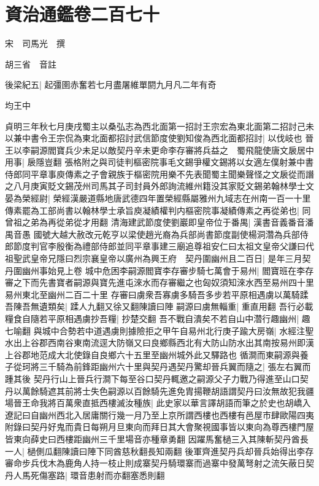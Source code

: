 \section{資治通鑑卷二百七十}
宋　司馬光　撰

胡三省　音註

後梁紀五|{
	起彊圉赤奮若七月盡屠維單閼九月凡二年有奇}


均王中

貞明三年秋七月庚戌蜀主以桑弘志為西北面第一招討王宗宏為東北面第二招討己未以兼中書令王宗侃為東北面都招討武信節度使劉知俊為西北面都招討|{
	以伐岐也}
晉王以李嗣源閻寶兵少未足以敵契丹辛未更命李存審將兵益之　蜀飛龍使唐文扆居中用事|{
	扆隱豈翻}
張格附之與司徒判樞密院事毛文錫爭權文錫將以女適左僕射兼中書侍郎同平章事庾傳素之子會親族于樞密院用樂不先表聞蜀主聞樂聲怪之文扆從而譖之八月庚寅貶文錫茂州司馬其子司封員外郎詢流維州籍没其家貶文錫弟翰林學士文晏為榮經尉|{
	榮經漢嚴道縣地唐武德四年置榮經縣屬雅州九域志在州南一百一十里}
傳素罷為工部尚書以翰林學士承旨庾凝績權判内樞密院事凝績傳素之再從弟也|{
	同曾祖之弟為再從弟從才用翻}
清海建武節度使劉巖即皇帝位于番禺|{
	漢書音義番音潘禺音愚}
國號大越大赦改元乾亨以梁使趙光裔為兵部尚書節度副使楊洞濳為兵部侍郎節度判官李殷衡為禮部侍郎並同平章事建三廟追尊祖安仁曰太祖文皇帝父謙曰代祖聖武皇帝兄隱曰烈宗襄皇帝以廣州為興王府　契丹圍幽州且二百日|{
	是年三月契丹圍幽州事始見上卷}
城中危困李嗣源閻寶李存審步騎七萬會于易州|{
	閻寶班在李存審之下而先書寶者嗣源與寶先進屯淶水而存審繼之也匈奴須知淶水西至易州四十里易州東北至幽州二百二十里}
存審曰虜衆吾寡虜多騎吾多步若平原相遇虜以萬騎蹂吾陳吾無遺類矣|{
	蹂人九翻又徐又翻陳讀曰陣}
嗣源曰虜無輜重|{
	重直用翻}
吾行必載糧食自隨若平原相遇虜抄吾糧|{
	抄楚交翻}
吾不戰自潰矣不若自山中濳行趣幽州|{
	趣七喻翻}
與城中合勢若中道遇虜則據險拒之甲午自易州北行庚子踰大房嶺|{
	水經注聖水出上谷郡西南谷東南流逕大防嶺又曰良鄉縣西北有大防山防水出其南按易州即漢上谷郡地范成大北使錄自良鄉六十五里至幽州城外此又驛路也}
循澗而東嗣源與養子從珂將三千騎為前鋒距幽州六十里與契丹遇契丹驚却晉兵翼而隨之|{
	張左右翼而踵其後}
契丹行山上晉兵行澗下每至谷口契丹輒邀之嗣源父子力戰乃得進至山口契丹以萬餘騎遮其前將士失色嗣源以百餘騎先進免胄揚鞭胡語謂契丹曰汝無故犯我疆場晉王命我將百萬衆直抵西樓滅汝種族|{
	此史家以華言譯胡語而筆之於史也胡嶠入遼記曰自幽州西北入居庸關行幾一月乃至上京所謂西樓也西樓有邑屋市肆歐陽四夷附錄曰契丹好鬼而貴日每朔月旦東向而拜日其大會聚視國事皆以東向為尊西樓門屋皆東向薛史曰西樓距幽州三千里場音亦種章勇翻}
因躍馬奮檛三入其陳斬契丹酋長一人|{
	檛側瓜翻陳讀曰陣下同酋慈秋翻長知兩翻}
後軍齊進契丹兵却晉兵始得出李存審命步兵伐木為鹿角人持一枝止則成寨契丹騎環寨而過寨中發萬弩射之流矢蔽日契丹人馬死傷塞路|{
	環音患射而亦翻塞悉則翻}
